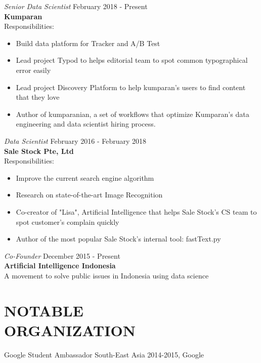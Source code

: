 \documentclass[margin, 10pt]{res} %
\begin{document}
\begin{resume}
{\sl Senior Data Scientist} \hfill February 2018 - Present \\
\textbf{Kumparan} \\
Responsibilities:
\begin{itemize} \itemsep -2pt %
\item Build data platform for Tracker and A/B Test
\item Lead project Typod to helps editorial team to spot common typographical error easily
\item Lead project Discovery Platform to help kumparan's users to find content that they love
\item Author of kumparanian, a set of workflows that optimize Kumparan's
data engineering and data scientist hiring process.
\end{itemize}

{\sl Data Scientist} \hfill February 2016 - February 2018 \\
\textbf{Sale Stock Pte, Ltd} \\
Responsibilities:
\begin{itemize} \itemsep -2pt %
\item Improve the current search engine algorithm
\item Research on state-of-the-art Image Recognition
\item Co-creator of "Lisa", Artificial Intelligence that helps Sale Stock's CS team to spot customer's complain quickly
\item Author of the most popular Sale Stock's internal tool: fastText.py
\end{itemize}

{\sl Co-Founder} \hfill December 2015 - Present \\
\textbf{Artificial Intelligence Indonesia} \\
A movement to solve public issues in Indonesia using data science


\section{NOTABLE\\ORGANIZATION}

Google Student Ambassador South-East Asia 2014-2015, Google\\



\end{resume}
\end{document}
